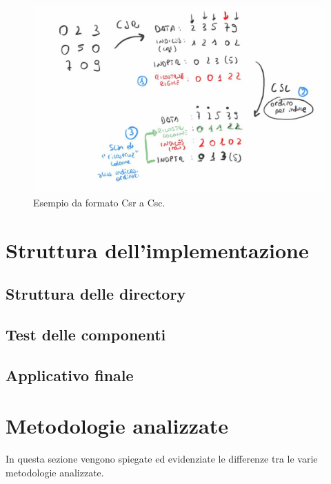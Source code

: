 \documentclass[]{IEEEtran}
\begin{document}
	\begin{figure}[h!]
		\includegraphics[scale=0.25]{figures/csr-to-csc.jpg}
		\caption{Esempio da formato Csr a Csc.}
	\end{figure}

	
	
\section{Struttura dell'implementazione} 
\label{struttura}
	\subsection{Struttura delle directory}
	
	\subsection{Test delle componenti}	
	
	\subsection{Applicativo finale}

\section{Metodologie analizzate}
\label{metodologie}
	In questa sezione vengono spiegate ed evidenziate le differenze tra le varie metodologie analizzate. 
		
\end{document}
